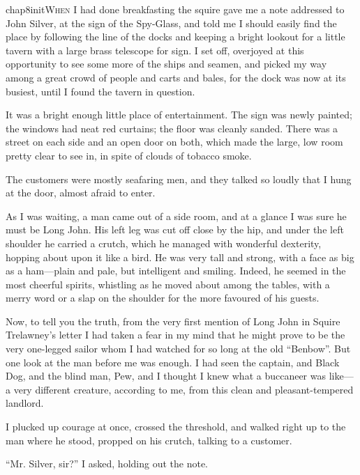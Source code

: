 
   \lettrine[lines=4,image=true]{chap8initW}{hen} I had done breakfasting the squire gave me a note addressed to John Silver, at the sign of the Spy-Glass, and told me I should easily find the place by following the line of the docks and keeping a bright lookout for a little tavern with a large brass telescope for sign. I set off, overjoyed at this opportunity to see some more of the ships and seamen, and picked my way among a great crowd of people and carts and bales, for the dock was now at its busiest, until I found the tavern in question.

It was a bright enough little place of entertainment. The sign was newly painted; the windows had neat red curtains; the floor was cleanly sanded. There was a street on each side and an open door on both, which made the large, low room pretty clear to see in, in spite of clouds of tobacco smoke.

The customers were mostly seafaring men, and they talked so loudly that I hung at the door, almost afraid to enter.

As I was waiting, a man came out of a side room, and at a glance I was sure he must be Long John. His left leg was cut off close by the hip, and under the left shoulder he carried a crutch, which he managed with wonderful dexterity, hopping about upon it like a bird. He was very tall and strong, with a face as big as a ham---plain and pale, but intelligent and smiling. Indeed, he seemed in the most cheerful spirits, whistling as he moved about among the tables, with a merry word or a slap on the shoulder for the more favoured of his guests.

Now, to tell you the truth, from the very first mention of Long John in Squire Trelawney’s letter I had taken a fear in my mind that he might prove to be the very one-legged sailor whom I had watched for so long at the old \enquote{Benbow}. But one look at the man before me was enough. I had seen the captain, and Black Dog, and the blind man, Pew, and I thought I knew what a buccaneer was like---a very different creature, according to me, from this clean and pleasant-tempered landlord.

I plucked up courage at once, crossed the threshold, and walked right up to the man where he stood, propped on his crutch, talking to a customer.

\enquote{Mr. Silver, sir?} I asked, holding out the note.

